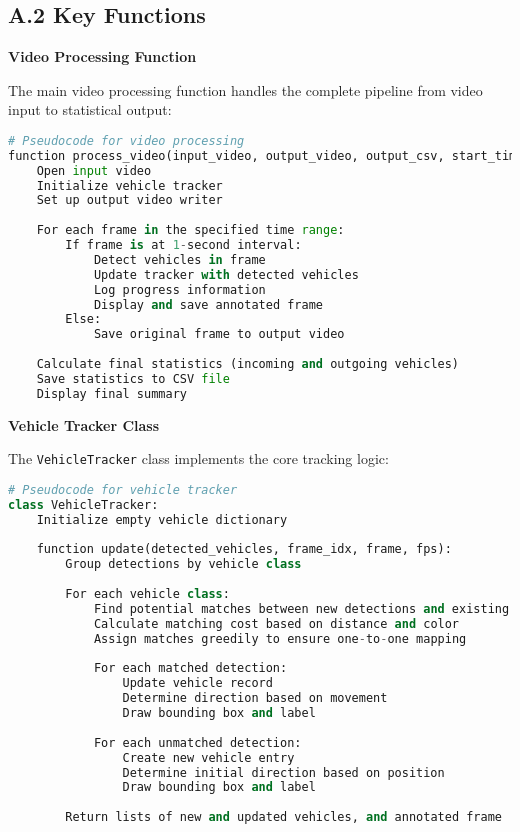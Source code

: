 \documentclass[9pt,a4paper,twoside]{rho-class/rho}
\begin{document}
    \subsection*{A.2 Key Functions}
    
    \textbf{Video Processing Function}
    
    The main video processing function handles the complete pipeline from video input to statistical output:
    
    \begin{lstlisting}[caption=Pseudocode for video processing, language=Python]
# Pseudocode for video processing
function process_video(input_video, output_video, output_csv, start_time, end_time):
    Open input video
    Initialize vehicle tracker
    Set up output video writer
    
    For each frame in the specified time range:
        If frame is at 1-second interval:
            Detect vehicles in frame
            Update tracker with detected vehicles
            Log progress information
            Display and save annotated frame
        Else:
            Save original frame to output video
    
    Calculate final statistics (incoming and outgoing vehicles)
    Save statistics to CSV file
    Display final summary
    \end{lstlisting}
    
    \textbf{Vehicle Tracker Class}
    
    The \texttt{VehicleTracker} class implements the core tracking logic:
    
    \begin{lstlisting}[caption=Pseudocode for vehicle tracker, language=Python]
# Pseudocode for vehicle tracker
class VehicleTracker:
    Initialize empty vehicle dictionary
    
    function update(detected_vehicles, frame_idx, frame, fps):
        Group detections by vehicle class
        
        For each vehicle class:
            Find potential matches between new detections and existing vehicles
            Calculate matching cost based on distance and color
            Assign matches greedily to ensure one-to-one mapping
            
            For each matched detection:
                Update vehicle record
                Determine direction based on movement
                Draw bounding box and label
                
            For each unmatched detection:
                Create new vehicle entry
                Determine initial direction based on position
                Draw bounding box and label
                
        Return lists of new and updated vehicles, and annotated frame
    \end{lstlisting}
    
\end{document}
